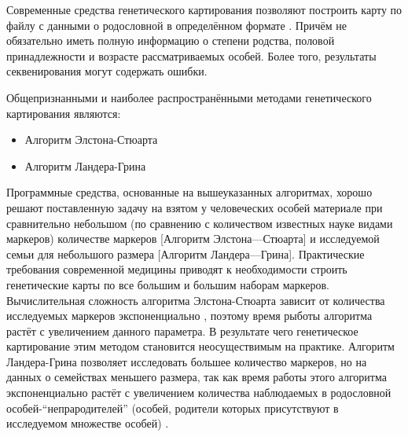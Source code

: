 \documentclass{matmex-diploma-custom}
\begin{document}
Современные средства генетического картирования позволяют построить
карту по файлу с данными о родословной в определённом формате
\cite{lander1987mapmaker, crimap, faslinkUrl}. Причём не обязательно
иметь полную информацию о степени родства, половой принадлежности и
возрасте рассматриваемых особей. Более того, результаты секвенирования
могут содержать ошибки.

Общепризнанными \cite{kruglyak1996parametric} и наиболее
распространёнными методами генетического картирования являются:
\begin{itemize}
\item Алгоритм Элстона-Стюарта
\item Алгоритм Ландера-Грина
\end{itemize}

Программные средства, основанные на вышеуказанных алгоритмах, хорошо
решают поставленную задачу на взятом у человеческих особей материале
при сравнительно небольшом (по сравнению с количеством известных науке
видами маркеров) количестве маркеров [Алгоритм Элстона---Стюарта] и
исследуемой семьи для небольшого размера [Алгоритм
Ландера---Грина]. Практические требования современной медицины
приводят к необходимости строить генетические карты по все большим и
большим наборам маркеров. Вычислительная сложность алгоритма
Элстона-Стюарта зависит от количества исследуемых маркеров
экспоненциально \cite{fishelson2002exact}, поэтому время рыботы
алгоритма растёт с увеличением данного параметра. В результате чего
генетическое картирование этим методом становится неосуществимым на
практике. Алгоритм Ландера-Грина позволяет исследовать большее
количество маркеров, но на данных о семействах меньшего размера, так
как время работы этого алгоритма экспоненциально растёт с увеличением
количества наблюдаемых в родословной особей-``непрародителей''
(особей, родители которых присутствуют в исследуемом множестве особей)
\cite{fishelson2002exact}.
\end{document}
